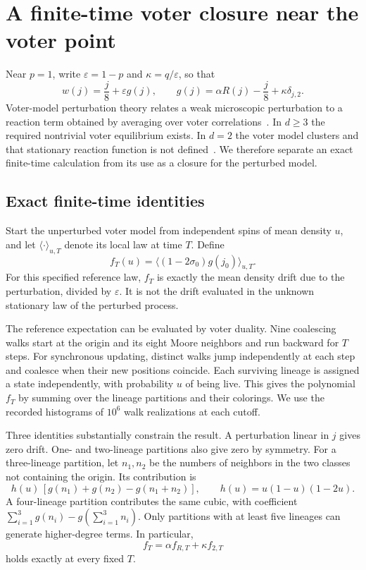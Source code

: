 \section{A finite-time voter closure near the voter point}
\label{sec:theory}

Near $p=1$, write $\varepsilon=1-p$ and $\kappa=q/\varepsilon$, so that
\begin{equation}
 w(j)=\frac j8+\varepsilon g(j),\qquad
 g(j)=\alpha R(j)-\frac j8+\kappa\delta_{j,2}.
 \label{eq:pert}
\end{equation}
Voter-model perturbation theory relates a weak microscopic perturbation to a reaction
term obtained by averaging over voter correlations~\cite{cox2013}. In $d\ge3$ the
required nontrivial voter equilibrium exists. In $d=2$ the voter model clusters and
that stationary reaction function is not defined~\cite{cox2025}. We therefore
separate an exact finite-time calculation from its use as a closure for the
perturbed model.

\subsection{Exact finite-time identities}

Start the unperturbed voter model from independent spins of mean density $u$, and
let $\langle\cdot\rangle_{u,T}$ denote its local law at time $T$. Define
\begin{equation}
 f_T(u)=\big\langle(1-2\sigma_0)g(j_0)\big\rangle_{u,T}.
 \label{eq:f}
\end{equation}
For this specified reference law, $f_T$ is exactly the mean density drift due to
the perturbation, divided by $\varepsilon$. It is not the drift evaluated in the
unknown stationary law of the perturbed process.

The reference expectation can be evaluated by voter duality. Nine coalescing walks
start at the origin and its eight Moore neighbors and run backward for $T$ steps.
For synchronous updating, distinct walks jump independently at each step and
coalesce when their new positions coincide. Each surviving lineage is assigned a
state independently, with probability $u$ of being live. This gives the polynomial
$f_T$ by summing over the lineage partitions and their colorings. We use the
recorded histograms of $10^6$ walk realizations at each cutoff.

Three identities substantially constrain the result. A perturbation linear in
$j$ gives zero drift. One- and two-lineage partitions also give zero by symmetry.
For a three-lineage partition, let $n_1,n_2$ be the numbers of neighbors in the
two classes not containing the origin. Its contribution is
\begin{equation}
 h(u)\,[g(n_1)+g(n_2)-g(n_1+n_2)],\qquad
 h(u)=u(1-u)(1-2u).
 \label{eq:three}
\end{equation}
A four-lineage partition contributes the same cubic, with coefficient
$\sum_{i=1}^3g(n_i)-g(\sum_{i=1}^3 n_i)$.
Only partitions with at least five lineages can generate higher-degree terms.
In particular,
\begin{equation}
 f_T=\alpha f_{R,T}+\kappa f_{2,T}
 \label{eq:linearclosure}
\end{equation}
holds exactly at every fixed $T$.

